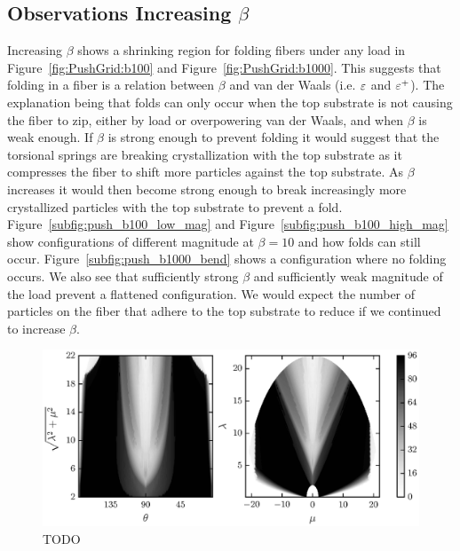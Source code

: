 \subsection{Observations Increasing $\beta$}

Increasing $\beta$ shows a shrinking region for folding fibers under any load in Figure~\ref{fig:PushGrid:b100} and Figure~\ref{fig:PushGrid:b1000}. This suggests that folding in a fiber is a relation between $\beta$ and van der Waals (i.e. $\varepsilon$ and $\varepsilon^+$). The explanation being that folds can only occur when the top substrate is not causing the fiber to zip, either by load or overpowering van der Waals, and when $\beta$ is weak enough. If $\beta$ is strong enough to prevent folding it would suggest that the torsional springs are breaking crystallization with the top substrate as it compresses the fiber to shift more particles against the top substrate. As $\beta$ increases it would then become strong enough to break increasingly more crystallized particles with the top substrate to prevent a fold. Figure~\ref{subfig:push_b100_low_mag} and Figure~\ref{subfig:push_b100_high_mag} show configurations of different magnitude at $\beta = 10$ and how folds can still occur. Figure~\ref{subfig:push_b1000_bend} shows a configuration where no folding occurs. We also see that sufficiently strong $\beta$ and sufficiently weak magnitude of the load prevent a flattened configuration. We would expect the number of particles on the fiber that adhere to the top substrate to reduce if we continued to increase $\beta$. 

	\begin{figure}
		\begin{center}
			\includegraphics{./fig/ch3/push/eb0.1/grid.eps}
		\end{center}		
		\caption{ TODO
		\label{fig:PushGrid:eb0.1}}
	\end{figure}	

